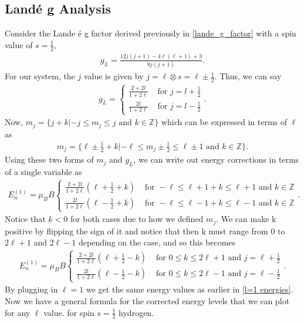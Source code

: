 \subsection{Land\'{e} g Analysis}

Consider the Lande \'{e} g factor derived previously in \ref{lande_g_factor} with a spin value of $s=\frac{1}{2}$,
\begin{align}
	g_L = \frac{12j(j+1)-4\ell(\ell+1)+3}{8j(j+1)}.
\end{align}
For our system, the $j$ value is given by $j=\ell \otimes s = \ell \pm \frac{1}{2}$. Thus, we can say
\begin{align}
	g_L = \begin{cases}
		\frac{2+2l}{1+2\ell} & \textrm{ for } j=l+\frac{1}{2} \\
		\frac{2l}{1+2\ell} & \textrm{ for } j=l-\frac{1}{2}
	\end{cases}.
\end{align}
Now, $m_j = \{j+k|-j \leq m_j \leq j \textrm{ and } k \in \mathbb{Z}\}$ which can be expressed in terms of $\ell$ as
\begin{align}
	m_j = \{\ell \pm \frac{1}{2}+k|-\ell \leq m_j\pm \frac{1}{2} \leq \ell \pm 1 \textrm{ and } k \in \mathbb{Z}\}.
\end{align}
Using these two forms of $m_j$ and $g_L$, we can write out energy corrections in terms of a single variable as
\begin{align}
	E_{n}^{(1)} = \mu_BB\begin{cases}
		\frac{2+2l}{1+2\ell}(\ell + \frac{1}{2}+k) & \textrm{ for } -\ell \leq \ell+ 1+k \leq \ell + 1 \textrm{ and } k \in \mathbb{Z}\\
		\frac{2l}{1+2\ell}(\ell - \frac{1}{2}+k) & \textrm{ for } -\ell \leq \ell - 1+k \leq \ell - 1 \textrm{ and } k \in \mathbb{Z}
	\end{cases}.
\end{align}
Notice that $k<0$ for both cases due to how we defined $m_j$. We can make k positive by flipping the sign of it and notice that then k must range from 0 to $2\ell+1$ and $2\ell-1$ depending on the case, and so this becomes
\begin{align}
	\boxed{E_{n}^{(1)} = \mu_BB\begin{cases}
			\frac{2+2l}{1+2\ell}(\ell + \frac{1}{2}-k) & \textrm{ for } 0 \leq k \leq 2\ell+1 \textrm{ and } j=\ell+\frac{1}{2}\\
			\frac{2l}{1+2\ell}(\ell - \frac{1}{2}-k) & \textrm{ for } 0 \leq k \leq 2\ell-1\textrm{ and } j=\ell-\frac{1}{2}
	\end{cases}}.
\end{align}
By plugging in $\ell=1$ we get the same energy values as earlier in \ref{l=1 energies}. Now we have a general formula for the corrected energy levels that we can plot for any $\ell$ value. for spin $s=\frac{1}{2}$ hydrogen.

